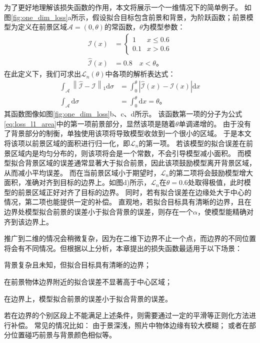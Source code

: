 为了更好地理解该损失函数的作用，本文将展示一个一维情况下的简单例子。
如图\ref{fig:one_dim_loss}a所示，假设拟合目标包含前景和背景，为阶跃函数；前景模型为定义在前景区域$\mathcal{A}=(0,\theta)$的常函数，$\theta$为模型参数：
\begin{align}
\mathcal{I}(x) &= \begin{cases}
    1   & x \leq 0.6 \\
    0.1 & x > 0.6
\end{cases}\\
\hat{\mathcal{I}}(x) &= 0.8 \quad x < \theta
\text{。}
\end{align}
在此定义下，我们可求出$\mathcal{L}_n(\theta)$中各项的解析表达式：
\begin{align}
\int_{\mathcal{A}} \left\| \hat{\mathcal{I}} - \mathcal{I} \right\|_1 \mathrm{d}\sigma
&= \int_0^{\theta} \left| \hat{\mathcal{I}}(x) - \mathcal{I}(x) \right| \mathrm{d}x \\
\int_{\mathcal{A}}\mathrm{d}\sigma &= \int_0^{\theta} \mathrm{d}x = \theta
\text{。}
\end{align}
其函数图像如图\ref{fig:one_dim_loss}b、c、d所示。
该函数第一项的分子为公式\ref{eq:loss_l1_area}中的第一项前景部分，显然该项是随着$\theta$单调递增的。
由于没有了背景部分的制衡，单独使用该项将导致模型收敛到一个很小的区域。
于是本文将该项以前景区域的面积进行归一化，即$\mathcal{L}_n$的第一项。
若该模型的拟合误差在前景区域内是均匀分布的，则该项将会是一个常数，不会引导模型减小面积。
而模型拟合背景区域的误差通常显著大于拟合前景，因此该项鼓励模型离开背景区域，从而减小平均误差。
而在当前景区域小于期望时，$\mathcal{L}_n$的第二项将会鼓励模型增大面积，准确对齐到目标的边界上。如图d)所示，$\mathcal{L}_n$在$\theta=0.6$处取得极值，此时模型的前景区域正好对齐了目标的边界。
同时，若有拟合误差在边缘处大于中心的情况，第二项也能提供一定的补偿。
直观地，若拟合目标具有清晰的边界，且在边界处模型拟合前景的误差小于拟合背景的误差，则存在一个$\alpha$，使模型能精确对齐到该边界上。

推广到二维的情况会稍微复杂，因为在二维下边界不止一个点，而边界的不同位置将会有不同情况。但根据以上分析，本章提出的损失函数最适用于以下场景：
\begin{enumerate*}
    \item 背景复杂且未知，但拟合目标具有清晰的边界；
    \item 在前景物体边界附近的拟合误差不显著高于中心区域；
    \item 在边界上，模型拟合前景的误差小于拟合背景的误差。
\end{enumerate*}
若在边界的个别区段上不能满足上述条件，则需要通过一定的平滑等正则化方法进行补偿。
常见的情况比如：
由于景深浅，照片中物体边缘有较大模糊；
或者在部分位置碰巧前景与背景颜色相似等。


